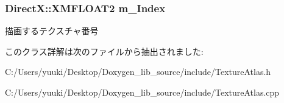 \subsubsection[{\texorpdfstring{m\+\_\+\+Index}{m_Index}}]{\setlength{\rightskip}{0pt plus 5cm}Direct\+X\+::\+X\+M\+F\+L\+O\+A\+T2 m\+\_\+\+Index\hspace{0.3cm}{\ttfamily [private]}}\hypertarget{class_a_p_i_1_1_texture_atlas_ade24c54e9200934a5852b874df6bfaaf}{}\label{class_a_p_i_1_1_texture_atlas_ade24c54e9200934a5852b874df6bfaaf}
描画するテクスチャ番号 

このクラス詳解は次のファイルから抽出されました\+:\begin{DoxyCompactItemize}
\item 
C\+:/\+Users/yuuki/\+Desktop/\+Doxygen\+\_\+lib\+\_\+source/include/Texture\+Atlas.\+h\item 
C\+:/\+Users/yuuki/\+Desktop/\+Doxygen\+\_\+lib\+\_\+source/include/Texture\+Atlas.\+cpp\end{DoxyCompactItemize}
